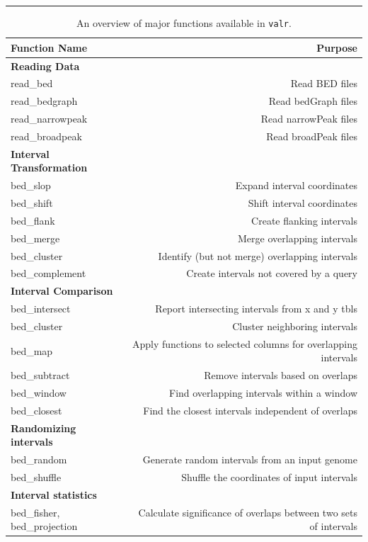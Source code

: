 \documentclass[9pt,a4paper]{extarticle}
\begin{document}
\begin{table}[h!]
\hrule \vspace{0.1cm}
\caption{\label{tab:tools} An overview of major functions available in \texttt{valr}.}
\centering
\begin{tabular}{lr}
 \bfseries \large Function Name & \bfseries  \large Purpose \\
  \hline
\bfseries Reading Data & \\
  read\_bed & Read BED files \\
  read\_bedgraph & Read bedGraph files \\
  read\_narrowpeak & Read narrowPeak files \\
  read\_broadpeak & Read broadPeak files \\
\bfseries Interval Transformation \\
  bed\_slop & Expand interval coordinates \\
  bed\_shift & Shift interval coordinates \\
  bed\_flank & Create flanking intervals \\
  bed\_merge & Merge overlapping intervals \\
  bed\_cluster & Identify (but not merge) overlapping intervals \\
  bed\_complement & Create intervals not covered by a query \\
\bfseries Interval Comparison & \\
  bed\_intersect & Report intersecting intervals from x and y tbls \\
  bed\_cluster & Cluster neighboring intervals \\
  bed\_map & Apply functions to selected columns for overlapping intervals \\
  bed\_subtract & Remove intervals based on overlaps \\
  bed\_window & Find overlapping intervals within a window \\
  bed\_closest & Find the closest intervals independent of overlaps \\
\bfseries Randomizing intervals & \\
  bed\_random & Generate random intervals from an input genome \\
  bed\_shuffle & Shuffle the coordinates of input intervals \\
\bfseries Interval statistics & \\
  bed\_fisher, bed\_projection & Calculate significance of overlaps between two sets of intervals \\

\end{tabular}
\end{table}
\end{document}
